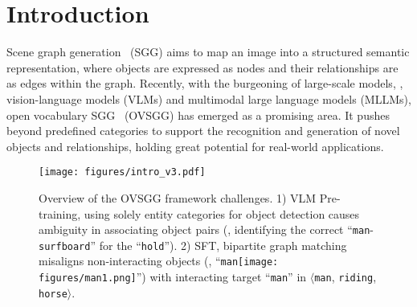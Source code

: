 \section{Introduction}
Scene graph generation~\cite{xu2017scene} (SGG) aims to map an image into a structured semantic representation, where objects are expressed as nodes and their relationships are as edges within the graph. Recently, with the burgeoning of large-scale models, \eg, vision-language models (VLMs) and multimodal large language models (MLLMs), open vocabulary SGG~\cite{he2022towards,li2024pixels,chen2024expanding} (OVSGG) has emerged as a promising area. It pushes beyond predefined categories to support the recognition and generation of novel objects and relationships, holding great potential for real-world applications.

\begin{figure}
    \centering
    \texttt{[image: figures/intro\_v3.pdf]}
    \vspace{-2em}
    \caption{ Overview of the OVSGG framework challenges.
1) VLM Pre-training, using solely entity categories for object detection causes ambiguity in associating object pairs (\eg, identifying the correct ``\texttt{man}-\texttt{surfboard}'' for the ``\texttt{hold}'').
2) SFT, bipartite graph matching misaligns non-interacting objects (\eg, ``\texttt{man}\texttt{[image: figures/man1.png]}'') with interacting target ``\texttt{man}'' in $\langle$\texttt{man}, \texttt{riding}, \texttt{horse}$\rangle$.}
    \label{fig:intro}
\vspace{-1em}
\end{figure}

